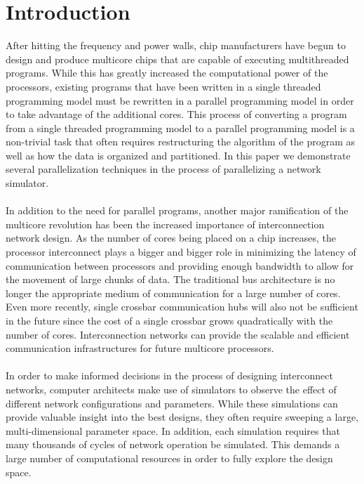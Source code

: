 \documentclass[twocolumn]{article}
\begin{document}
\section{Introduction}
After hitting the frequency and power walls, chip manufacturers have begun
to design and produce multicore chips that are capable of executing
multithreaded programs.  While this has greatly increased the computational power of the processors, existing programs that have been
written in a single threaded programming model must be rewritten in a
parallel programming model in order to take advantage of the additional cores.  This process of converting a program from a single threaded
programming model to a parallel programming model is a non-trivial task
that often requires restructuring the algorithm of the program as well as
how the data is organized and partitioned.  In this paper we demonstrate
several parallelization techniques in the process of parallelizing a
network simulator.\\
~\\
In addition to the need for parallel programs, another major ramification of the multicore revolution has been the
increased importance of interconnection network design.  As the number of
cores being placed on a chip increases, the processor interconnect plays a bigger and
bigger role in minimizing the latency of communication between processors
and providing enough bandwidth to allow for the movement of large chunks
of data. The traditional bus architecture is no longer the appropriate medium of communication for a large number of cores. Even more recently, single crossbar communication hubs will also not be sufficient in the future since the cost of a single crossbar grows quadratically with the number of cores. Interconnection networks can provide the scalable and efficient communication
infrastructures for future multicore processors. \\
~\\
In order to make informed decisions in the process of designing
interconnect networks, computer architects make use of simulators to
observe the effect of different network configurations and parameters.  While
these simulations can provide valuable insight into the best designs, they
often require sweeping a large, multi-dimensional parameter space.  In
addition, each simulation requires that many thousands of cycles
of network operation be simulated.  This demands a large number of computational
resources in order to fully explore the design space.\\
\end{document}
